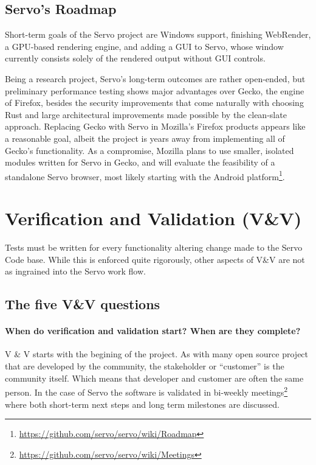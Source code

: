 \documentclass{scrartcl}
\begin{document}
\subsection{Servo's Roadmap}
Short-term goals of the Servo project are Windows support, finishing WebRender, a GPU-based rendering engine, and adding a GUI to Servo, whose window currently consists solely of the rendered output without GUI controls.
 
Being a research project, Servo's long-term outcomes are rather open-ended, but preliminary performance testing shows major advantages over Gecko, the engine of Firefox, besides the security improvements that come naturally with choosing Rust and large architectural improvements made possible by the clean-slate approach. Replacing Gecko with Servo in Mozilla's Firefox products appears like a reasonable goal, albeit the project is years away from implementing all of Gecko's functionality. As a compromise, Mozilla plans to use smaller, isolated modules written for Servo in Gecko, and will evaluate the feasibility of a standalone Servo browser, most likely starting with the Android platform\footnote{\url{https://github.com/servo/servo/wiki/Roadmap}}.

\newpage


\section{Verification and Validation (V\&V)}

Tests must be written for every functionality altering change made to the Servo Code base. While this is enforced quite rigorously, other aspects of V\&V are not as ingrained into the Servo work flow.


\subsection{The five V\&V questions}

\paragraph{When do verification and validation start? When are they complete?}
V \& V starts with the begining of the project. As with many open source project that are developed by the community, the stakeholder or ``customer'' is the community itself. Which means that developer and customer are often the same person. In the case of Servo the software is validated in bi-weekly meetings\footnote{\url{https://github.com/servo/servo/wiki/Meetings}} where both short-term next steps and long term milestones are discussed.\\
  
\end{document}
